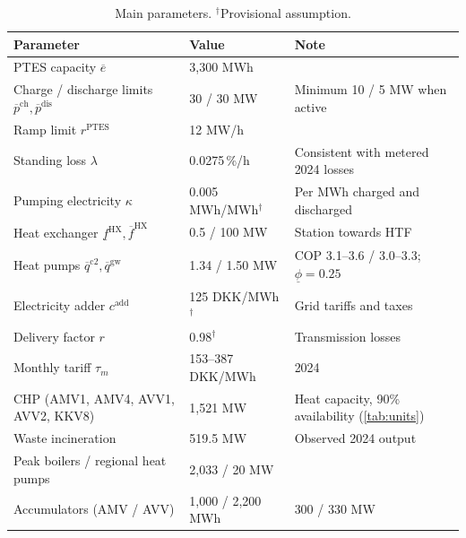 \begin{table}[!htb]
    \centering
    \small
    \caption{Main parameters. $^{\dagger}$Provisional assumption.}
    \label{tab:parameters}
    \begin{tabular}{lll}
        \toprule
        Parameter & Value & Note \\
        \midrule
        PTES capacity $\overline e$ & 3,300 MWh & \\
        Charge / discharge limits $\overline p^{\mathrm{ch}},\overline p^{\mathrm{dis}}$ & 30 / 30 MW & Minimum 10 / 5 MW when active \\
        Ramp limit $r^{\mathrm{PTES}}$ & 12 MW/h & \\
        Standing loss $\lambda$ & 0.0275\,\%/h & Consistent with metered 2024 losses \\
        Pumping electricity $\kappa$ & 0.005 MWh/MWh$^{\dagger}$ & Per MWh charged and discharged \\
        Heat exchanger $\underline f^{\mathrm{HX}},\overline f^{\mathrm{HX}}$ & 0.5 / 100 MW & Station towards HTF \\
        Heat pumps $\overline q^{\mathrm{c2}},\overline q^{\mathrm{gw}}$ & 1.34 / 1.50 MW & COP 3.1--3.6 / 3.0--3.3; $\underline\phi=0.25$ \\
        Electricity adder $c^{\mathrm{add}}$ & 125 DKK/MWh$^{\dagger}$ & Grid tariffs and taxes \\
        Delivery factor $r$ & 0.98$^{\dagger}$ & Transmission losses \\
        Monthly tariff $\tau_m$ & 153--387 DKK/MWh & 2024 \\
        CHP (AMV1, AMV4, AVV1, AVV2, KKV8) & 1,521 MW & Heat capacity, 90\% availability (\cref{tab:units}) \\
        Waste incineration & 519.5 MW & Observed 2024 output \\
        Peak boilers / regional heat pumps & 2,033 / 20 MW & \\
        Accumulators (AMV / AVV) & 1,000 / 2,200 MWh & 300 / 330 MW \\
        \bottomrule
    \end{tabular}
\end{table}
